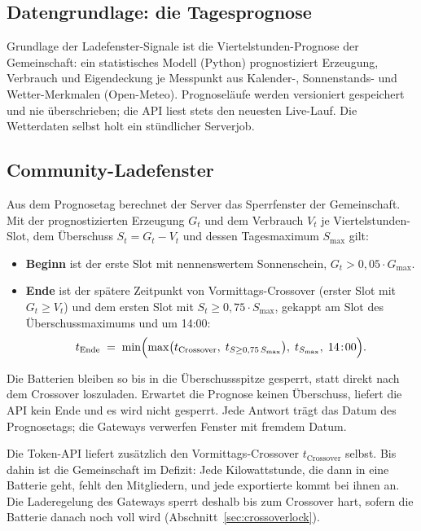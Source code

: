 \documentclass[11pt,a4paper]{article}
\begin{document}
\subsection{Datengrundlage: die Tagesprognose}

Grundlage der Ladefenster-Signale ist die Viertelstunden-Prognose der
Gemeinschaft: ein statistisches Modell (Python) prognostiziert Erzeugung,
Verbrauch und Eigendeckung je Messpunkt aus Kalender-, Sonnenstands- und
Wetter-Merkmalen (Open-Meteo). Prognoseläufe werden versioniert gespeichert
und nie überschrieben; die API liest stets den neuesten Live-Lauf. Die
Wetterdaten selbst holt ein stündlicher Serverjob.

\subsection{Community-Ladefenster}

Aus dem Prognosetag berechnet der Server das Sperrfenster der Gemeinschaft.
Mit der prognostizierten Erzeugung $G_t$ und dem Verbrauch $V_t$ je
Viertelstunden-Slot, dem Überschuss $S_t = G_t - V_t$ und dessen
Tagesmaximum $S_{\max}$ gilt:

\begin{itemize}
  \item \textbf{Beginn} ist der erste Slot mit nennenswertem Sonnenschein,
    $G_t > 0{,}05 \cdot G_{\max}$.
  \item \textbf{Ende} ist der spätere Zeitpunkt von Vormittags-Crossover
    (erster Slot mit $G_t \geq V_t$) und dem ersten Slot mit
    $S_t \geq 0{,}75 \cdot S_{\max}$, gekappt am Slot des
    Überschussmaximums und um 14:00:
    \begin{equation}
      t_{\text{Ende}} \;=\; \min\Bigl(
        \max\bigl(t_{\text{Crossover}},\; t_{S \geq 0{,}75\,S_{\max}}\bigr),
        \; t_{S_{\max}},\; 14\!:\!00 \Bigr).
    \end{equation}
\end{itemize}

Die Batterien bleiben so bis in die Überschussspitze gesperrt, statt direkt
nach dem Crossover loszuladen. Erwartet die Prognose keinen Überschuss,
liefert die API kein Ende und es wird nicht gesperrt. Jede Antwort trägt
das Datum des Prognosetags; die Gateways verwerfen Fenster mit fremdem
Datum.

Die Token-API liefert zusätzlich den Vormittags-Crossover
$t_{\text{Crossover}}$ selbst. Bis dahin ist die Gemeinschaft im Defizit:
Jede Kilowattstunde, die dann in eine Batterie geht, fehlt den Mitgliedern,
und jede exportierte kommt bei ihnen an. Die Laderegelung des Gateways
sperrt deshalb bis zum Crossover hart, sofern die Batterie danach noch voll
wird (Abschnitt~\ref{sec:crossoverlock}).
\end{document}
